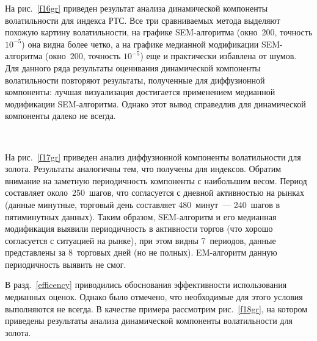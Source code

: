 \begin{multicols}{2}
На рис.~\ref{f16gr} приведен результат анализа динамической компоненты
волатильности для индекса РТС. Все три сравниваемых метода
выделяют похожую картину волатильности, на графике SEM-ал\-го\-рит\-ма
(окно~$200$, точность $10^{-5}$) она видна более четко, а на
графике медианной модификации SEM-алгоритма (окно~$200$, точность
$10^{-5}$) еще и практически избавлена от шумов. Для данного ряда
результаты оценивания динамической компоненты волатильности
повторяют результаты, полученные для диффузионной компоненты:
лучшая визуализация достигается применением медианной модификации
SEM-алгоритма. Однако этот вывод справедлив для динамической
компоненты далеко не всегда.

\begin{figure*}
\vspace*{1pt}
\begin{center}
\mbox{%
\epsfxsize=117.633mm
}
\end{center}
\vspace*{-9pt}
\end{figure*}

На рис.~\ref{f17gr} приведен анализ диффузионной компоненты волатильности
для золота. Результаты аналогичны тем, что получены для индексов.
Обратим внимание на заметную периодичность компоненты с наибольшим
весом. Период составляет около~250~ша\-гов, что согласуется с
дневной активностью на рынках (данные минутные, торговый день
составляет 480~минут~--- 240~шагов в пятиминутных данных).
Таким образом, SEM-алгоритм и его медианная модификация выявили
периодичность в активности торгов (что хорошо согласуется с
ситуацией на рынке), при этом видны 7~периодов, данные
представлены за 8~торговых дней (но не полных). EM-алгоритм
данную периодичность выявить не смог.

В разд.~\ref{efficency} приводились обоснования эффективности
использования медианных оценок. Однако было отмечено, что
необходимые для этого условия выполняются не всегда. В качестве
примера рассмотрим рис.~\ref{f18gr}, на котором приведены результаты
анализа динамической компоненты волатильности для золота.


\end{multicols}
